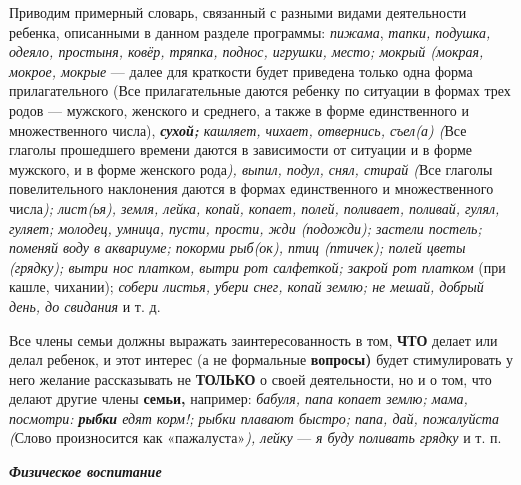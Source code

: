 \documentclass{book}
\renewcommand{\emph}[1]{\textit{#1}}
\begin{document}
Приводим примерный словарь, связанный с разными видами деятельности
ребенка, описанными в данном разделе программы: \emph{пижама},
\emph{тапки, подушка, одеяло, простыня, ковёр, тряпка, поднос, игрушки,
место; мокрый (мокрая, мокрое, мокрые} --- далее для краткости будет
приведена только одна форма прилагательного (Все прилагательные даются
ребенку по ситуации в формах трех родов --- мужского, женского и
среднего, а также в форме единственного и множественного числа),
\emph{\textbf{сухой;} кашляет, чихает, отвернись, съел(а) (}Все глаголы
прошедшего времени даются в зависимости от ситуации и в форме мужского,
и в форме женского рода\emph{), выпил, подул, снял, стирай (}Все глаголы
повелительного наклонения даются в формах единственного и множественного
числа\emph{); лист(ья), земля, лейка, копай, копает, полей, поливает,
поливай, гулял, гуляет; молодец, умница, пусти, прости, жди (подожди);
застели постель; поменяй воду в аквариуме; покорми рыб(ок), птиц
(птичек); полей цветы (грядку); вытри нос платком, вытри рот салфеткой;
закрой рот платком} (при кашле, чихании); \emph{собери листья, убери
снег, копай землю; не мешай, добрый день, до свидания} и т. д.

Все члены семьи должны выражать заинтересованность в том, \textbf{ЧТО}
делает или делал ребенок, и этот интерес (а не формальные
\textbf{вопросы)} будет стимулировать у него желание рассказывать не
\textbf{ТОЛЬКО} о своей деятельности, но и о том, что делают другие
члены \textbf{семьи,} например: \emph{бабуля, папа копает землю; мама,
посмотри: \textbf{рыбки} едят корм!; рыбки плавают быстро; папа, дай,
пожалуйста (}Слово произносится как «пажалуста»\emph{), лейку} ---
\emph{я буду поливать грядку} и т. п.

\emph{\textbf{Физическое воспитание}}
\end{document}
